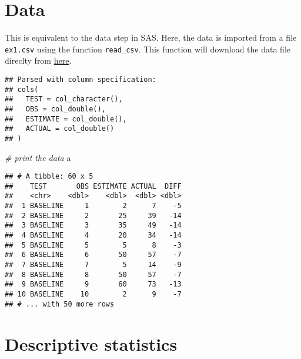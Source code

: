 \documentclass[]{book}
\newenvironment{Shaded}{\begin{snugshade}}{\end{snugshade}}
\newcommand{\CommentTok}[1]{\textcolor[rgb]{0.56,0.35,0.01}{\textit{#1}}}
\newcommand{\DataTypeTok}[1]{\textcolor[rgb]{0.13,0.29,0.53}{#1}}
\newcommand{\KeywordTok}[1]{\textcolor[rgb]{0.13,0.29,0.53}{\textbf{#1}}}
\newcommand{\NormalTok}[1]{#1}
\newcommand{\OperatorTok}[1]{\textcolor[rgb]{0.81,0.36,0.00}{\textbf{#1}}}
\newcommand{\StringTok}[1]{\textcolor[rgb]{0.31,0.60,0.02}{#1}}
\begin{document}
\hypertarget{data}{%
\section{Data}\label{data}}

This is equivalent to the data step in SAS. Here, the data is imported from a file \texttt{ex1.csv} using the function \texttt{read\_csv}. This function will download the data file direclty from \href{https://raw.githubusercontent.com/luckymehra/epidem-exercises/master/data/ex1.csv}{here}.

\begin{Shaded}
\end{Shaded}

\begin{verbatim}
## Parsed with column specification:
## cols(
##   TEST = col_character(),
##   OBS = col_double(),
##   ESTIMATE = col_double(),
##   ACTUAL = col_double()
## )
\end{verbatim}

\begin{Shaded}
\begin{Highlighting}[]
\CommentTok{# print the data}
\NormalTok{a}
\end{Highlighting}
\end{Shaded}

\begin{verbatim}
## # A tibble: 60 x 5
##    TEST       OBS ESTIMATE ACTUAL  DIFF
##    <chr>    <dbl>    <dbl>  <dbl> <dbl>
##  1 BASELINE     1        2      7    -5
##  2 BASELINE     2       25     39   -14
##  3 BASELINE     3       35     49   -14
##  4 BASELINE     4       20     34   -14
##  5 BASELINE     5        5      8    -3
##  6 BASELINE     6       50     57    -7
##  7 BASELINE     7        5     14    -9
##  8 BASELINE     8       50     57    -7
##  9 BASELINE     9       60     73   -13
## 10 BASELINE    10        2      9    -7
## # ... with 50 more rows
\end{verbatim}

\hypertarget{descriptive-statistics}{%
\section{Descriptive statistics}\label{descriptive-statistics}}
\end{document}
